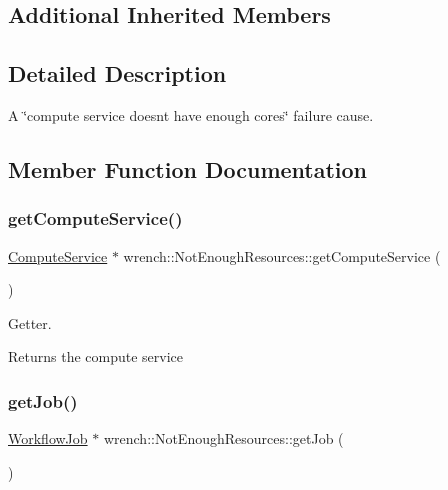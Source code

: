 \subsection*{Additional Inherited Members}


\subsection{Detailed Description}
A \char`\"{}compute service doesn\textquotesingle{}t have enough cores\char`\"{} failure cause. 

\subsection{Member Function Documentation}
\mbox{\label{classwrench_1_1_not_enough_resources_a2ded283721b584804b1220b2db4548b3}} 
\subsubsection{\texorpdfstring{get\+Compute\+Service()}{getComputeService()}}
{\footnotesize\ttfamily \hyperlink{classwrench_1_1_compute_service}{Compute\+Service} $\ast$ wrench\+::\+Not\+Enough\+Resources\+::get\+Compute\+Service (\begin{DoxyParamCaption}{ }\end{DoxyParamCaption})}



Getter. 

\begin{DoxyReturn}{Returns}
the compute service 
\end{DoxyReturn}
\mbox{\label{classwrench_1_1_not_enough_resources_a8bf50edc9be82619b404ae82a9288f94}} 
\subsubsection{\texorpdfstring{get\+Job()}{getJob()}}
{\footnotesize\ttfamily \hyperlink{classwrench_1_1_workflow_job}{Workflow\+Job} $\ast$ wrench\+::\+Not\+Enough\+Resources\+::get\+Job (\begin{DoxyParamCaption}{ }\end{DoxyParamCaption})}



